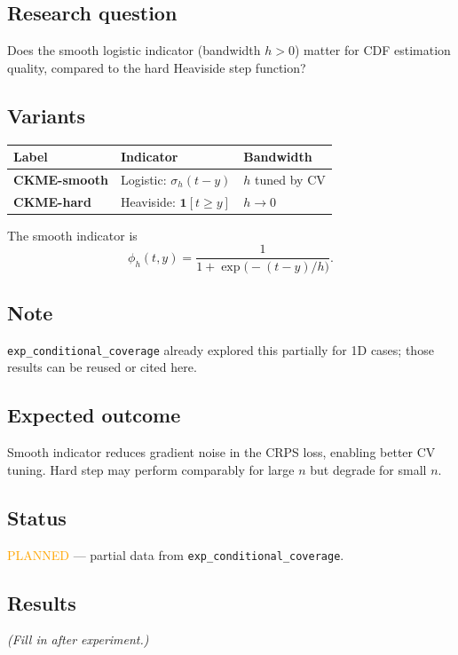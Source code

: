 \documentclass[11pt]{article}
\begin{document}
\subsection*{Research question}
Does the smooth logistic indicator (bandwidth $h > 0$) matter for
CDF estimation quality, compared to the hard Heaviside step function?

\subsection*{Variants}

\begin{center}
\begin{tabular}{lll}
  \toprule
  Label & Indicator & Bandwidth \\
  \midrule
  \textbf{CKME-smooth} & Logistic: $\sigma_h(t - y)$ & $h$ tuned by CV \\
  \textbf{CKME-hard} & Heaviside: $\mathbf{1}[t \ge y]$ & $h \to 0$ \\
  \bottomrule
\end{tabular}
\end{center}

\noindent
The smooth indicator is
\[
  \phi_h(t, y) = \frac{1}{1 + \exp\!\bigl(-(t - y)/h\bigr)}.
\]

\subsection*{Note}
\texttt{exp\_conditional\_coverage} already explored this partially
for 1D cases; those results can be reused or cited here.

\subsection*{Expected outcome}
Smooth indicator reduces gradient noise in the CRPS loss,
enabling better CV tuning.
Hard step may perform comparably for large $n$ but degrade for small $n$.

\subsection*{Status}
\textcolor{orange}{PLANNED} --- partial data from \texttt{exp\_conditional\_coverage}.

\subsection*{Results}
\textit{(Fill in after experiment.)}
\end{document}
